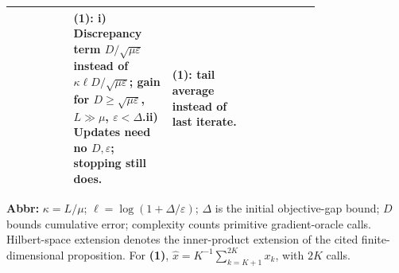 \begin{table}[tp]
\begin{threeparttable}
\begin{tabularx}{\linewidth}{@{}>{\raggedright\arraybackslash}p{0.20\linewidth}>{\raggedright\arraybackslash}p{0.32\linewidth}>{\raggedright\arraybackslash}p{0.25\linewidth}>{\raggedright\arraybackslash}X@{}}
& \textbf{(1)}: i) Discrepancy term $D/\sqrt{\mu\varepsilon}$ instead of $\kappa\ell D/\sqrt{\mu\varepsilon}$; gain for $D\ge\sqrt{\mu\varepsilon}$, $L\gg\mu$, $\varepsilon<\Delta$.\newline ii) Updates need no $D,\varepsilon$; stopping still does.
& \textbf{(1)}: tail average instead of last iterate. \\
\bottomrule
\end{tabularx}
\begin{tablenotes}[flushleft]\footnotesize
\item[] \textbf{Abbr:} $\kappa=L/\mu$; $\ell=\log(1+\Delta/\varepsilon)$; $\Delta$ is the initial objective-gap bound; $D$ bounds cumulative error; complexity counts primitive gradient-oracle calls. Hilbert-space extension denotes the inner-product extension of the cited finite-dimensional proposition. For \textbf{(1)}, $\widehat x=K^{-1}\sum_{k=K+1}^{2K}x_k$, with $2K$ calls.
\end{tablenotes}
\end{threeparttable}
\end{table}
\clearpage
